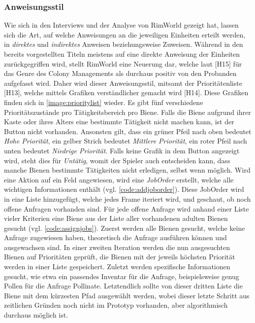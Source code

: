 \subsubsection{Anweisungsstil}
Wie sich in den Interviews und der Analyse von RimWorld gezeigt hat, lassen sich die Art, auf welche Anweisungen an die jeweiligen Einheiten erteilt werden, in \textit{direktes} und \textit{indirektes} Anweisen beziehungsweise Zuweisen. Während in den bereits vorgestellten Titeln meistens auf eine direkte Anweisung der Einheiten zurückgegriffen wird, stellt RimWorld eine Neuerung dar, welche laut [H15] für das Genre des Colony Managements als durchaus positiv von den Probanden aufgefasst wird. Daher wird dieser Anweisungsstil, mitsamt der Prioritätenliste [H13], welche mittels Grafiken verständlicher gemacht wird [H14]. Diese Grafiken finden sich in \autoref{image:prioritylist} wieder. Es gibt fünf verschiedene Prioritätszustände pro Tätigkeitsbereich pro Biene. Falls die Biene aufgrund ihrer Kaste oder ihres Alters eine bestimmte Tätigkeit nicht machen kann, ist der Button nicht vorhanden. Ansonsten gilt, dass ein grüner Pfeil nach oben bedeutet \textit{Hohe Priorität}, ein gelber Strich bedeutet \textit{Mittlere Priorität}, ein roter Pfeil nach unten bedeutet \textit{Niedrige Priorität}. Falls keine Grafik in dem Button angezeigt wird, steht dies für \textit{Untätig}, womit der Spieler auch entscheiden kann, dass manche Bienen bestimmte Tätigkeiten nicht erledigen, selbst wenn möglich. Wird eine Aktion auf ein Feld angewiesen, wird eine \textit{JobOrder} erstellt, welche alle wichtigen Informationen enthält (vgl. \autoref{code:addjoborder}). Diese JobOrder wird in eine Liste hinzugefügt, welche jedes Frame iteriert wird, und geschaut, ob noch offene Anfragen vorhanden sind. Für jede offene Anfrage wird anhand einer Liste vieler Kriterien eine Biene aus der Liste aller vorhandenen adulten Bienen gesucht (vgl. \autoref{code:assignjobs}). Zuerst werden alle Bienen gesucht, welche keine Anfrage zugewiesen haben, theoretisch die Anfrage ausführen können und ausgewachsen sind. In einer zweiten Iteration werden die nun ausgesuchten Bienen auf Prioritäten geprüft, die Bienen mit der jeweils höchsten Priorität werden in einer Liste gespeichert. Zuletzt werden spezifische Informationen gesucht, wie etwa ein passendes Inventar für die Anfrage, beispielsweise genug Pollen für die Anfrage Pollinate. Letztendlich sollte von dieser dritten Liste die Biene mit dem kürzesten Pfad ausgewählt werden, wobei dieser letzte Schritt aus zeitlichen Gründen noch nicht im Prototyp vorhanden, aber algorithmisch durchaus möglich ist.


